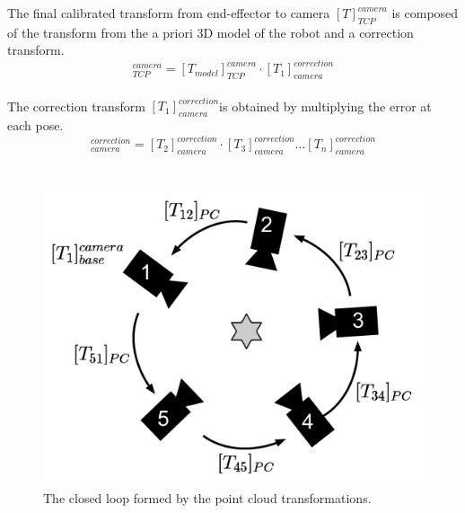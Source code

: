 \noindent The final calibrated transform from end-effector to camera $[T]_{TCP}^{camera}$ is composed of the transform from the a priori 3D model of the robot and a correction transform. \\

\begin{equation}
[T]_{TCP}^{camera} = [T_{model}]_{TCP}^{camera} \cdot [T_1]_{camera}^{correction}
\end{equation}\\

The correction transform $[T_1]_{camera}^{correction}$is obtained by multiplying the error at each pose. \\

\begin{equation}
[T_1]_{camera}^{correction} = [T_2]_{camera}^{correction} \cdot [T_3]_{camera}^{correction} \dots [T_n]_{camera}^{correction}
\end{equation}\\

\begin{figure}[htb]
	\begin{center}
		\includegraphics[scale=0.4,trim=0 0 0 0]{graphics/03_calibration/new_calibration.pdf}%
		\caption{The closed loop formed by the point cloud transformations.}\label{fig:new_calibration}
	\end{center}
\end{figure}


 



